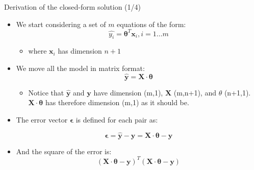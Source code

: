 \documentclass{beamer}
\begin{document}
\begin{frame}
{\centerline{Derivation of the closed-form solution  (1/4) }}

\begin{itemize}
\item We start considering a set of $m$ equations of the form:
$$ \hat{y_i} = \boldsymbol \theta^T \boldsymbol x_i, i=1\ldots m$$
\begin{itemize}
\item  where $\boldsymbol x_i$ has dimension $n+1$
\end{itemize}
\item We move all the model in matrix format:
$$  \hat{\boldsymbol y} = \boldsymbol X \cdot \boldsymbol \theta   $$
\begin{itemize}
\item   Notice that $\hat{\boldsymbol y}$ and $\boldsymbol y$ have dimension (m,1), $\boldsymbol X$ (m,n+1), and $\theta$  (n+1,1). $\boldsymbol X \cdot \boldsymbol \theta$ has therefore dimension (m,1) as it should be.
\end{itemize}

\item The error vector $ {\boldsymbol \epsilon}$ is defined for each pair as:

$$ {\boldsymbol \epsilon} = \hat{\boldsymbol y} - \boldsymbol y = \boldsymbol X \cdot \boldsymbol \theta - {\boldsymbol y} $$

\item And the square of the error is:
$$  (\boldsymbol X \cdot \boldsymbol \theta - \boldsymbol y)^T (\boldsymbol X \cdot \boldsymbol \theta - \boldsymbol y) $$

\end{itemize}

\end{frame}
\end{document}
